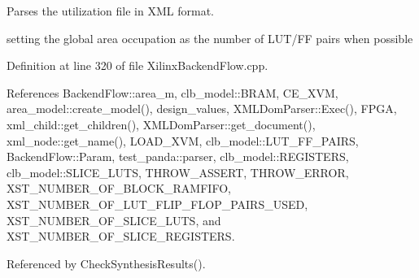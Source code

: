 Parses the utilization file in X\+ML format. 

setting the global area occupation as the number of L\+U\+T/\+FF pairs when possible 

Definition at line 320 of file Xilinx\+Backend\+Flow.\+cpp.



References Backend\+Flow\+::area\+\_\+m, clb\+\_\+model\+::\+B\+R\+AM, C\+E\+\_\+\+X\+VM, area\+\_\+model\+::create\+\_\+model(), design\+\_\+values, X\+M\+L\+Dom\+Parser\+::\+Exec(), F\+P\+GA, xml\+\_\+child\+::get\+\_\+children(), X\+M\+L\+Dom\+Parser\+::get\+\_\+document(), xml\+\_\+node\+::get\+\_\+name(), L\+O\+A\+D\+\_\+\+X\+VM, clb\+\_\+model\+::\+L\+U\+T\+\_\+\+F\+F\+\_\+\+P\+A\+I\+RS, Backend\+Flow\+::\+Param, test\+\_\+panda\+::parser, clb\+\_\+model\+::\+R\+E\+G\+I\+S\+T\+E\+RS, clb\+\_\+model\+::\+S\+L\+I\+C\+E\+\_\+\+L\+U\+TS, T\+H\+R\+O\+W\+\_\+\+A\+S\+S\+E\+RT, T\+H\+R\+O\+W\+\_\+\+E\+R\+R\+OR, X\+S\+T\+\_\+\+N\+U\+M\+B\+E\+R\+\_\+\+O\+F\+\_\+\+B\+L\+O\+C\+K\+\_\+\+R\+A\+M\+F\+I\+FO, X\+S\+T\+\_\+\+N\+U\+M\+B\+E\+R\+\_\+\+O\+F\+\_\+\+L\+U\+T\+\_\+\+F\+L\+I\+P\+\_\+\+F\+L\+O\+P\+\_\+\+P\+A\+I\+R\+S\+\_\+\+U\+S\+ED, X\+S\+T\+\_\+\+N\+U\+M\+B\+E\+R\+\_\+\+O\+F\+\_\+\+S\+L\+I\+C\+E\+\_\+\+L\+U\+TS, and X\+S\+T\+\_\+\+N\+U\+M\+B\+E\+R\+\_\+\+O\+F\+\_\+\+S\+L\+I\+C\+E\+\_\+\+R\+E\+G\+I\+S\+T\+E\+RS.



Referenced by Check\+Synthesis\+Results().

